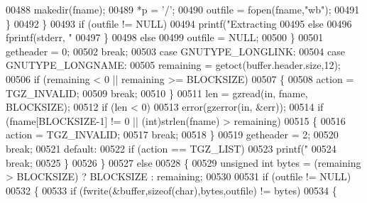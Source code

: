 \begin{DoxyCode}
{{{{{{00488                           makedir(fname);
00489                           *p = \textcolor{charliteral}{'/'};
00490                           outfile = fopen(fname,\textcolor{stringliteral}{"wb"});
00491                         \}
00492                       \}
00493                       \textcolor{keywordflow}{if} (outfile != NULL)
00494                         printf(\textcolor{stringliteral}{"Extracting %
00495                       \textcolor{keywordflow}{else}
00496                         fprintf(stderr, \textcolor{stringliteral}{"%
00497                     \}
00498                   \textcolor{keywordflow}{else}
00499                     outfile = NULL;
00500                 \}
00501               getheader = 0;
00502               \textcolor{keywordflow}{break};
00503             \textcolor{keywordflow}{case} GNUTYPE\_LONGLINK:
00504             \textcolor{keywordflow}{case} GNUTYPE\_LONGNAME:
00505               remaining = getoct(buffer.header.size,12);
00506               \textcolor{keywordflow}{if} (remaining < 0 || remaining >= BLOCKSIZE)
00507                 \{
00508                   action = TGZ\_INVALID;
00509                   \textcolor{keywordflow}{break};
00510                 \}
00511               len = gzread(in, fname, BLOCKSIZE);
00512               \textcolor{keywordflow}{if} (len < 0)
00513                 error(gzerror(in, &err));
00514               \textcolor{keywordflow}{if} (fname[BLOCKSIZE-1] != 0 || (\textcolor{keywordtype}{int})strlen(fname) > remaining)
00515                 \{
00516                   action = TGZ\_INVALID;
00517                   \textcolor{keywordflow}{break};
00518                 \}
00519               getheader = 2;
00520               \textcolor{keywordflow}{break};
00521             \textcolor{keywordflow}{default}:
00522               \textcolor{keywordflow}{if} (action == TGZ\_LIST)
00523                 printf(\textcolor{stringliteral}{" %
00524               \textcolor{keywordflow}{break};
00525             \}
00526         \}
00527       \textcolor{keywordflow}{else}
00528         \{
00529           \textcolor{keywordtype}{unsigned} \textcolor{keywordtype}{int} bytes = (remaining > BLOCKSIZE) ? BLOCKSIZE : remaining;
00530 
00531           \textcolor{keywordflow}{if} (outfile != NULL)
00532             \{
00533               \textcolor{keywordflow}{if} (fwrite(&buffer,\textcolor{keyword}{sizeof}(\textcolor{keywordtype}{char}),bytes,outfile) != bytes)
00534                 \{
}}}}}}}}}
\end{DoxyCode}
